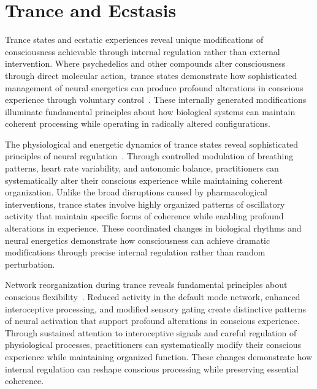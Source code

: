 \section{Trance and Ecstasis}

Trance states and ecstatic experiences reveal unique modifications of consciousness achievable through internal regulation rather than external intervention. Where psychedelics and other compounds alter consciousness through direct molecular action,~trance states demonstrate how sophisticated management of neural energetics can produce profound alterations in conscious experience through voluntary control~\cite{Rouget1985, van2025processes}. These internally generated modifications illuminate fundamental principles about how biological systems can maintain coherent processing while operating in radically altered configurations.

The physiological and energetic dynamics of trance states reveal sophisticated principles of neural regulation~\cite{Becker2004, pinotsis2023cytoelectric, Lewis2003, amil2024theta}. Through controlled modulation of breathing patterns, heart rate variability, and autonomic balance, practitioners can systematically alter their conscious experience while maintaining coherent organization. Unlike the broad disruptions caused by pharmacological interventions, trance states involve highly organized patterns of oscillatory activity that maintain specific forms of coherence while enabling profound alterations in experience. These coordinated changes in biological rhythms and neural energetics demonstrate how consciousness can achieve dramatic modifications through precise internal regulation rather than random perturbation.

Network reorganization during trance reveals fundamental principles about conscious flexibility~\cite{Wier2009, bosl2025dynamical, Goodman1988, zheng2025unbearable}. Reduced activity in the default mode network, enhanced interoceptive processing, and modified sensory gating create distinctive patterns of neural activation that support profound alterations in conscious experience. Through sustained attention to interoceptive signals and careful regulation of physiological processes, practitioners can systematically modify their conscious experience while maintaining organized function. These changes demonstrate how internal regulation can reshape conscious processing while preserving essential coherence.

